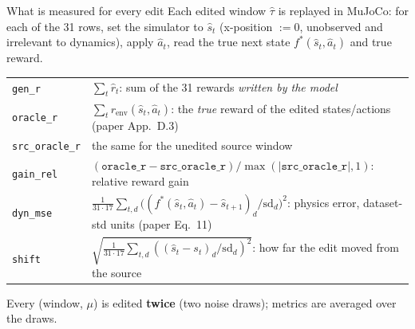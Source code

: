 \documentclass[aspectratio=169,11pt]{beamer}
\begin{document}
\begin{frame}{What is measured for every edit}
Each edited window $\hat\tau$ is replayed in MuJoCo: for each of the 31 rows, set the simulator to $\hat s_t$ (x-position $:=0$, unobserved and irrelevant to dynamics), apply $\hat a_t$, read the true next state $f^*(\hat s_t,\hat a_t)$ and true reward.
\vspace{0.4em}

\small
\begin{tabularx}{\linewidth}{lY}
\toprule
\texttt{gen\_r} & $\sum_t\hat r_t$: sum of the 31 rewards \emph{written by the model}\\
\texttt{oracle\_r} & $\sum_t r_{\text{env}}(\hat s_t,\hat a_t)$: the \emph{true} reward of the edited states/actions (paper App.~D.3)\\
\texttt{src\_oracle\_r} & the same for the unedited source window\\
\texttt{gain\_rel} & $(\texttt{oracle\_r}-\texttt{src\_oracle\_r})/\max(|\texttt{src\_oracle\_r}|,1)$: relative reward gain\\
\texttt{dyn\_mse} & $\frac{1}{31\cdot17}\sum_{t,d}\big((f^*(\hat s_t,\hat a_t)-\hat s_{t+1})_d/\mathrm{sd}_d\big)^2$: physics error, dataset-std units (paper Eq.~11)\\
\texttt{shift} & $\sqrt{\frac{1}{31\cdot17}\sum_{t,d}((\hat s_t-s_t)_d/\mathrm{sd}_d)^2}$: how far the edit moved from the source\\
\bottomrule
\end{tabularx}
\vspace{0.3em}

Every (window, $\mu$) is edited \textbf{twice} (two noise draws); metrics are averaged over the draws.
\end{frame}
\end{document}
